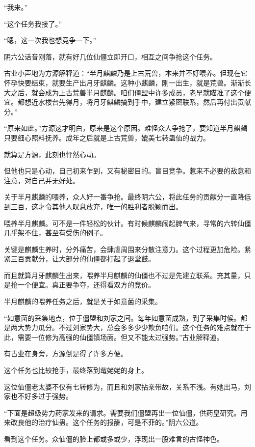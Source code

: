 \begin{this_body}
“我来。”

“这个任务我接了。”

“嗯，这一次我也想竞争一下。”

阴六公话音刚落，就有好几位仙僵立即开口，相互之间争抢这个任务。

古业小声地为方源解释道：“半月麒麟乃是上古荒兽，本来并不好喂养。但现在它怀孕快要结束，就要生产出月牙麒麟。这种小麒麟，刚一出生，就是荒兽。渐渐长大之后，就会成为上古荒兽半月麒麟。咱们僵盟中许多成员，老早就瞄准了这个便宜。都想近水楼台先得月，将月牙麒麟搞到手中，建立紧密联系，然后再付出贡献分。”

“原来如此。”方源这才明白，原来是这个原因。难怪众人争抢了，要知道半月麒麟只要细心照料抚养。成年之后就是上古荒兽，媲美七转蛊仙的战力。

就算是方源，此刻也怦然心动。

但他也只是心动，自己初来乍到，又有秘密目的。盲目竞争。惹来不必要的敌意和注意，对自己并无好处。

关于半月麒麟的喂养，众人好一番争抢。最终阴六公，将此任务的贡献分一直降低到三百，这才令其他人叹息放弃，唯一的胜利者脱颖而出。

喂养半月麒麟。可不是一件轻松的伙计。有时候麒麟闹起脾气来，寻常的六转仙僵几乎架不住，甚至有受伤的例子。

关键是麒麟生养时，分外痛苦，会肆虐周围来分散注意力。这个过程更加危险。紧紧三百贡献分，让大部分的仙僵都打起了退堂鼓。

而且就算月牙麒麟生出来，喂养半月麒麟的仙僵也不过是先建立联系。充其量，只是抢一个便宜。真正要争夺，还得看双方的竞价。

半月麒麟的喂养任务之后，就是关于如意菌的采集。

“如意菌的采集地点，位于僵盟和刘家之间。每年如意菌成熟，到了采集时候。都是两大势力瓜分。不过刘家势大，总会多多少少欺负咱们。这个任务的难点就在于此，需要一位修为高强的仙僵镇场面。但又不能太过强势。”古业解释道。

有古业在身旁，方源倒是得了许多方便。

这个任务也比较抢手，最终落到鼋姥姥的身上。

这位仙僵老太婆不仅有七转修为，而且和刘家拈亲带故，关系不浅。有她出马，刘家也不好多过于强势。

“下面是超级势力药家发来的请求。需要我们僵盟再出一位仙僵，供药皇研究。用来改良他的治疗仙蛊。这个任务的报酬，可是不菲的。”阴六公道。

看到这个任务。众仙僵的脸上都或多或少，浮现出一股难言的古怪神色。


\end{this_body}

